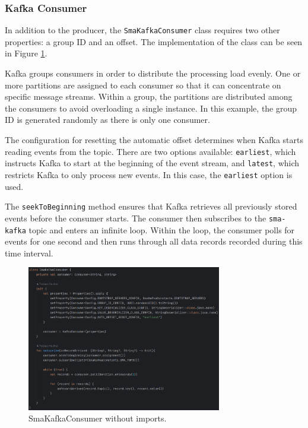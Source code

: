 \subsubsection{Kafka Consumer}

In addition to the producer, the \lstinline{SmaKafkaConsumer} class requires two other properties: a group ID and an offset. The implementation of the class can be seen in Figure \ref{fig:consumer}.

Kafka groups consumers in order to distribute the processing load evenly. One or more partitions are assigned to each consumer so that it can concentrate on specific message streams. Within a group, the partitions are distributed among the consumers to avoid overloading a single instance. In this example, the group ID is generated randomly as there is only one consumer.

The configuration for resetting the automatic offset determines when Kafka starts reading events from the topic. There are two options available: \lstinline{earliest}, which instructs Kafka to start at the beginning of the event stream, and \lstinline{latest}, which restricts Kafka to only process new events. In this case, the \lstinline{earliest} option is used.

The \lstinline{seekToBeginning} method ensures that Kafka retrieves all previously stored events before the consumer starts. The consumer then subscribes to the \lstinline{sma-kafka} topic and enters an infinite loop. Within the loop, the consumer polls for events for one second and then runs through all data records recorded during this time interval.

\begin{figure}[ht]
    \centering
    \includegraphics[width=8.5cm]{images/consumer.png}
    \caption{SmaKafkaConsumer without imports.}
    \label{fig:consumer}
\end{figure}
